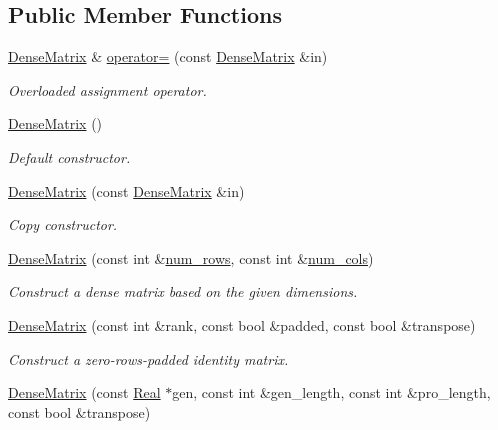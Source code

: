 \subsection*{Public Member Functions}
\begin{DoxyCompactItemize}
\item 
\hyperlink{classmtk_1_1DenseMatrix}{Dense\-Matrix} \& \hyperlink{classmtk_1_1DenseMatrix_a0d27dc7c4d2c49f391017e392345ced0}{operator=} (const \hyperlink{classmtk_1_1DenseMatrix}{Dense\-Matrix} \&in)
\begin{DoxyCompactList}\small\item\em Overloaded assignment operator. \end{DoxyCompactList}\item 
\hyperlink{classmtk_1_1DenseMatrix_a0c75ee704707983f935b02835eab0933}{Dense\-Matrix} ()
\begin{DoxyCompactList}\small\item\em Default constructor. \end{DoxyCompactList}\item 
\hyperlink{classmtk_1_1DenseMatrix_a90102d605a668bf7ecf0d766cc4c10db}{Dense\-Matrix} (const \hyperlink{classmtk_1_1DenseMatrix}{Dense\-Matrix} \&in)
\begin{DoxyCompactList}\small\item\em Copy constructor. \end{DoxyCompactList}\item 
\hyperlink{classmtk_1_1DenseMatrix_abe26c623467fc1b293cf4f22a3a47cc8}{Dense\-Matrix} (const int \&\hyperlink{classmtk_1_1DenseMatrix_a17d8d3b9cc0926044b6972dd190a5c21}{num\-\_\-rows}, const int \&\hyperlink{classmtk_1_1DenseMatrix_af6f78373aaf2136f0c78974d7c8de0a8}{num\-\_\-cols})
\begin{DoxyCompactList}\small\item\em Construct a dense matrix based on the given dimensions. \end{DoxyCompactList}\item 
\hyperlink{classmtk_1_1DenseMatrix_a4ef0dec1b5558fcf00719bfac059ec68}{Dense\-Matrix} (const int \&rank, const bool \&padded, const bool \&transpose)
\begin{DoxyCompactList}\small\item\em Construct a zero-\/rows-\/padded identity matrix. \end{DoxyCompactList}\item 
\hyperlink{classmtk_1_1DenseMatrix_a4a85c10adb8a1d695c992eb5fd3e3dac}{Dense\-Matrix} (const \hyperlink{group__c01-roots_gac080bbbf5cbb5502c9f00405f894857d}{Real} $\ast$gen, const int \&gen\-\_\-length, const int \&pro\-\_\-length, const bool \&transpose)

\end{DoxyCompactItemize}

